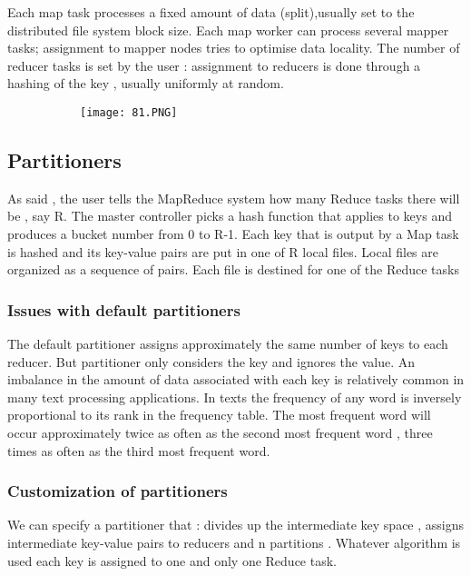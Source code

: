 \documentclass{article}
\begin{document}
Each map task processes a fixed amount of data (split),usually set to the distributed file system block size. Each map worker can process several mapper tasks; assignment to mapper nodes tries to optimise data locality.
The number of reducer tasks is set by the user : assignment to reducers is done through a hashing of the key , usually uniformly at random.

\begin{figure}[ht!]
  \centering
  \begin{subfigure}[b]{0.5\linewidth}
    \texttt{[image: 81.PNG]}
  \end{subfigure}
\end{figure}


\subsection{Partitioners}
As said , the user tells the MapReduce system how many Reduce tasks there will be , say R.
The master controller picks a hash function that applies to keys and produces a bucket number from 0 to R-1.
Each key that is output by a Map task is hashed and its key-value pairs are put in one of R local files.
Local files are organized as a sequence of pairs.
Each file is destined for one of the Reduce tasks

\subsubsection{Issues with default partitioners}
The default partitioner assigns approximately the same number of keys to each reducer. But partitioner only considers the key and ignores the value.
An imbalance in the amount of data associated with each key is relatively common in many text processing applications.
In texts the frequency of any word is inversely proportional to its rank in the frequency table.
The most frequent word will occur approximately twice as often as the second most frequent word , three times as often as the third most frequent word.

\subsubsection{Customization of partitioners}
We can specify a partitioner that : divides up the intermediate key space , assigns intermediate key-value pairs to reducers and n partitions .
Whatever algorithm is used each key is assigned to one and only one Reduce task.
\end{document}
